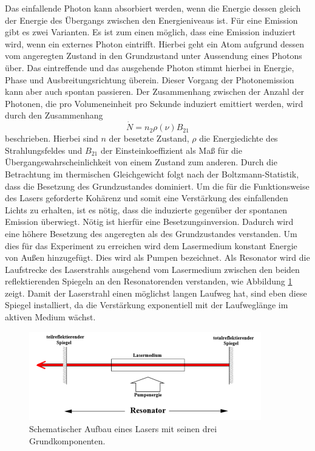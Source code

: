 Das einfallende Photon kann absorbiert werden, wenn die Energie dessen gleich der Energie des Übergangs zwischen den Energieniveaus ist.
Für eine Emission gibt es zwei Varianten.
Es ist zum einen möglich, dass eine Emission induziert wird, wenn ein externes Photon eintrifft.
Hierbei geht ein Atom aufgrund dessen vom angeregten Zustand in den Grundzustand unter Aussendung eines Photons über.
Das eintreffende und das ausgehende Photon stimmt hierbei in Energie, Phase und Ausbreitungsrichtung überein.
Dieser Vorgang der Photonemission kann aber auch spontan passieren.
Der Zusammenhang zwischen der Anzahl der Photonen, die pro Volumeneinheit pro Sekunde induziert emittiert werden, wird durch den Zusammenhang
\begin{equation}
  \dot{N} = n_2\rho(\nu)B_\text{21}
\end{equation}
beschrieben.
Hierbei sind $n$ der besetzte Zustand, $\rho$ die Energiedichte des Strahlungsfeldes und $B_\text{21}$ der Einsteinkoeffizient als Maß für die Übergangswahrscheinlichkeit von einem Zustand zum anderen.
Durch die Betrachtung im thermischen Gleichgewicht folgt nach der Boltzmann-Statistik, dass die Besetzung des Grundzustandes dominiert.
Um die für die Funktionsweise des Lasers geforderte Kohärenz und somit eine Verstärkung des einfallenden Lichts zu erhalten, ist es nötig, dass die induzierte gegenüber der spontanen Emission überwiegt.
Nötig ist hierfür eine Besetzungsinversion.
Dadurch wird eine höhere Besetzung des angeregten als des Grundzustandes verstanden.
Um dies für das Experiment zu erreichen wird dem Lasermedium konstant Energie von Außen hinzugefügt.
Dies wird als Pumpen bezeichnet.
Als Resonator wird die Laufstrecke des Laserstrahls ausgehend vom Lasermedium zwischen den beiden reflektierenden Spiegeln an den Resonatorenden verstanden, wie Abbildung \ref{fig:resonator} zeigt.
Damit der Laserstrahl einen möglichst langen Laufweg hat, sind eben diese Spiegel installiert, da die Verstärkung exponentiell mit der Laufweglänge im aktiven Medium wächst.

\begin{figure}[H]
  \centering
  \includegraphics[width=0.9\textwidth]{Bilder/resonator.png}
  \caption{Schematischer Aufbau eines Lasers mit seinen drei Grundkomponenten.\cite{anleitung}}
  \label{fig:resonator}
\end{figure}

